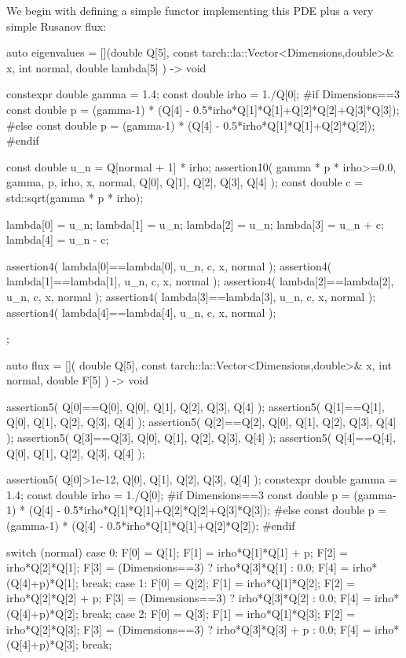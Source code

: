 We begin with defining a simple functor implementing this PDE plus a very simple
Rusanov flux:
\begin{code}
auto eigenvalues = [](double Q[5], const tarch::la::Vector<Dimensions,double>& x, 
  int normal, double lambda[5]
) -> void {
  constexpr double gamma = 1.4;
  const double irho = 1./Q[0];
  #if Dimensions==3
    const double p = (gamma-1) * (Q[4] - 0.5*irho*Q[1]*Q[1]+Q[2]*Q[2]+Q[3]*Q[3]);
  #else
    const double p = (gamma-1) * (Q[4] - 0.5*irho*Q[1]*Q[1]+Q[2]*Q[2]);
  #endif

  const double u_n = Q[normal + 1] * irho;
  assertion10( gamma * p * irho>=0.0, gamma, p, irho, x, normal, Q[0], Q[1], Q[2], Q[3], Q[4] );
  const double c   = std::sqrt(gamma * p * irho);

  lambda[0]  = u_n;
  lambda[1]  = u_n;
  lambda[2]  = u_n;
  lambda[3]  = u_n + c;
  lambda[4]  = u_n - c;
    
  assertion4( lambda[0]==lambda[0], u_n, c, x, normal );
  assertion4( lambda[1]==lambda[1], u_n, c, x, normal );
  assertion4( lambda[2]==lambda[2], u_n, c, x, normal );
  assertion4( lambda[3]==lambda[3], u_n, c, x, normal );
  assertion4( lambda[4]==lambda[4], u_n, c, x, normal );
};
  
auto flux = [](
  double Q[5], const tarch::la::Vector<Dimensions,double>& x, int normal, double F[5]
) -> void {
  assertion5( Q[0]==Q[0], Q[0], Q[1], Q[2], Q[3], Q[4] );    
  assertion5( Q[1]==Q[1], Q[0], Q[1], Q[2], Q[3], Q[4] );    
  assertion5( Q[2]==Q[2], Q[0], Q[1], Q[2], Q[3], Q[4] );    
  assertion5( Q[3]==Q[3], Q[0], Q[1], Q[2], Q[3], Q[4] );    
  assertion5( Q[4]==Q[4], Q[0], Q[1], Q[2], Q[3], Q[4] );    
    
  assertion5( Q[0]>1e-12, Q[0], Q[1], Q[2], Q[3], Q[4] );
  constexpr double gamma = 1.4;
  const double irho = 1./Q[0];
  #if Dimensions==3
    const double p = (gamma-1) * (Q[4] - 0.5*irho*Q[1]*Q[1]+Q[2]*Q[2]+Q[3]*Q[3]);
  #else
    const double p = (gamma-1) * (Q[4] - 0.5*irho*Q[1]*Q[1]+Q[2]*Q[2]);
  #endif

  switch (normal) {
    case 0:
      {
        F[0] = Q[1];
        F[1] = irho*Q[1]*Q[1] + p;
        F[2] = irho*Q[2]*Q[1];
        F[3] = (Dimensions==3) ? irho*Q[3]*Q[1] : 0.0;
        F[4] = irho*(Q[4]+p)*Q[1];
      }
      break;
    case 1:
      {
        F[0] = Q[2];
        F[1] = irho*Q[1]*Q[2];
        F[2] = irho*Q[2]*Q[2] + p;
        F[3] = (Dimensions==3) ? irho*Q[3]*Q[2] : 0.0;
        F[4] = irho*(Q[4]+p)*Q[2];
      }
      break;
    case 2:
      {
        F[0] = Q[3];
        F[1] = irho*Q[1]*Q[3];
        F[2] = irho*Q[2]*Q[3];
        F[3] = (Dimensions==3) ? irho*Q[3]*Q[3] + p : 0.0;
        F[4] = irho*(Q[4]+p)*Q[3];
      }
      break;
  }

}
\end{code}
